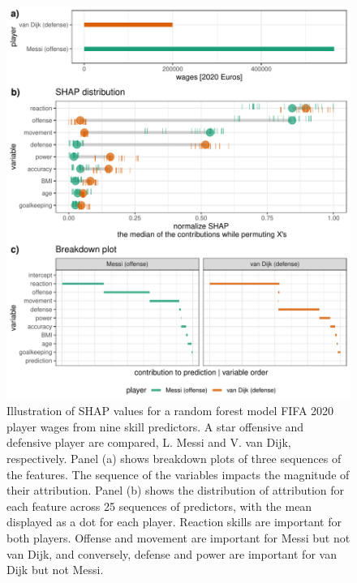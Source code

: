 \documentclass[11pt,twoside]{article}
\begin{document}
\begin{figure}

{\centering \includegraphics[width=0.85\linewidth]{./figures/shap_distr_bd} 

}

\caption{Illustration of SHAP values for a random forest model FIFA 2020 player wages from nine skill predictors. A star offensive and defensive player are compared, L. Messi and V. van Dijk, respectively. Panel (a) shows breakdown plots of three sequences of the features. The sequence of the variables impacts the magnitude of their attribution. Panel (b) shows the distribution of attribution for each feature across 25 sequences of predictors, with the mean displayed as a dot for each player. Reaction skills are important for both players. Offense and movement are important for Messi but not van Dijk, and conversely, defense and power are important for van Dijk but not Messi.}\label{fig:shapdistrbd}
\end{figure}
\end{document}
